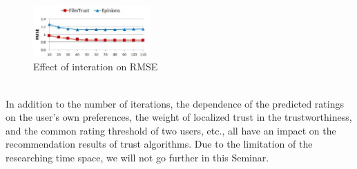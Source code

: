     \begin{figure}[H] %
        \centering %
        \includegraphics[width=0.4\textwidth]{figures/parameter2.png} %
        \caption{Effect of interation on RMSE} %
        \label{Fig.2: Effect of interation on RMSE} %
        \end{figure}
\\
In addition to the number of iterations, the dependence of the predicted ratings on 
the user's own preferences, the weight of localized trust in the trustworthiness, and 
the common rating threshold of two users, etc., all have an impact on the recommendation 
results of trust algorithms\cite{b26}. Due to the limitation of the researching time space, 
we will not go further in this Seminar.